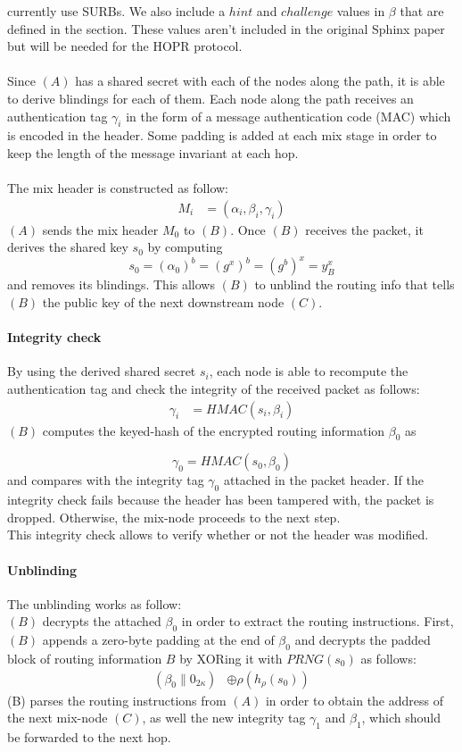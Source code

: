     currently use SURBs. We also include a $hint$ and $challenge$ values in
    $\beta$ that are defined in the  section. These values aren't included in the original Sphinx paper but will be needed for the HOPR protocol.
    \\~\\Since $(A)$ has a shared secret with each of the nodes along the path, it is able to derive blindings for each of them.
    \newline Each node along the path receives an authentication tag $\gamma_i$ in the form of a message authentication code (MAC)
which is encoded in the header.
\newline Some padding is added at each mix stage in order to keep the length of the message invariant at each hop.
\\~\\The mix header is constructed as follow: 
\begin{align}  
    M_i&=(\alpha_i,\beta_i,\gamma_i)
\end{align}
\newline $(A)$ sends the mix header $M_0$ to $(B)$. Once $(B)$ receives the packet, it derives the shared key $s_0$ by computing $$s_0=(\alpha_0)^b=(g^x)^b=(g^b)^x=y^x_B$$
and removes its blindings. This allows $(B)$ to unblind the routing info that tells $(B)$ the public key of the next downstream node $(C)$.
\paragraph{Integrity check}
By using the derived shared secret $s_i$, each node is able to recompute the authentication tag and check the integrity of the received packet as follows: 
\begin{align}  
    \gamma_i&=HMAC(s_i,\beta_i)
    \label{eq:6}
\end{align}
$(B)$ computes the keyed-hash of the encrypted routing information $\beta_0$ as

    $$\gamma_0=HMAC(s_0,\beta_0)$$
and compares with the integrity tag $\gamma_0$ attached in the packet header. If the integrity check fails because the header has been tampered with, the packet is dropped. Otherwise, the mix-node proceeds to the next step.
\\This integrity check allows to verify whether or not the header was modified.

\paragraph{Unblinding}
The unblinding works as follow:
\\$(B)$ decrypts the attached $\beta_0$ in order to extract the routing instructions. First, $(B)$ appends a zero-byte padding at the end of $\beta_0$ and decrypts the padded block of routing information $B$ by XORing it with $PRNG(s_{0})$ as follows:
\begin{align}
    (\beta_0\|0_{2\kappa})&\oplus \rho(h_{\rho}(s_{0}))
\end{align}
(B) parses the routing instructions from $(A)$ in order to obtain the address of the next mix-node $(C)$, as well the new integrity tag $\gamma_1$ and $\beta_1$, which should be forwarded to the next hop.
